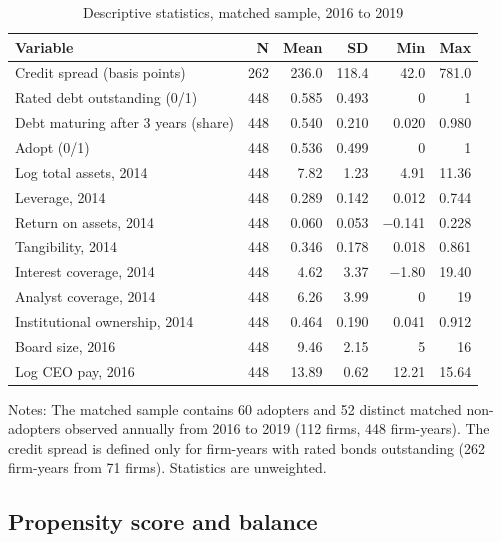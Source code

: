 \documentclass[11pt]{article}
\begin{document}
\begin{table}[!htbp]
\centering
\begin{threeparttable}
\caption{Descriptive statistics, matched sample, 2016 to 2019}
\label{tab:desc}
\small
\begin{tabular}{lrrrrr}
\toprule
Variable & N & Mean & SD & Min & Max \\
\midrule
Credit spread (basis points) & 262 & 236.0 & 118.4 & 42.0 & 781.0 \\
Rated debt outstanding (0/1) & 448 & 0.585 & 0.493 & 0 & 1 \\
Debt maturing after 3 years (share) & 448 & 0.540 & 0.210 & 0.020 & 0.980 \\
Adopt (0/1) & 448 & 0.536 & 0.499 & 0 & 1 \\
Log total assets, 2014 & 448 & 7.82 & 1.23 & 4.91 & 11.36 \\
Leverage, 2014 & 448 & 0.289 & 0.142 & 0.012 & 0.744 \\
Return on assets, 2014 & 448 & 0.060 & 0.053 & $-$0.141 & 0.228 \\
Tangibility, 2014 & 448 & 0.346 & 0.178 & 0.018 & 0.861 \\
Interest coverage, 2014 & 448 & 4.62 & 3.37 & $-$1.80 & 19.40 \\
Analyst coverage, 2014 & 448 & 6.26 & 3.99 & 0 & 19 \\
Institutional ownership, 2014 & 448 & 0.464 & 0.190 & 0.041 & 0.912 \\
Board size, 2016 & 448 & 9.46 & 2.15 & 5 & 16 \\
Log CEO pay, 2016 & 448 & 13.89 & 0.62 & 12.21 & 15.64 \\
\bottomrule
\end{tabular}
\begin{tablenotes}\footnotesize
\item Notes: The matched sample contains 60 adopters and 52 distinct matched non-adopters observed annually from 2016 to 2019 (112 firms, 448 firm-years). The credit spread is defined only for firm-years with rated bonds outstanding (262 firm-years from 71 firms). Statistics are unweighted.
\end{tablenotes}
\end{threeparttable}
\end{table}

\subsection{Propensity score and balance}
\end{document}
